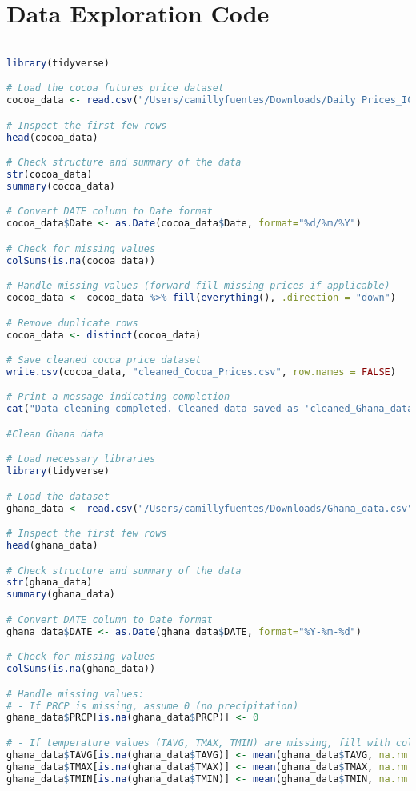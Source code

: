 \chapter{Data Exploration Code}
\label{appn:B}
\begin{lstlisting}[language=R]

library(tidyverse)

# Load the cocoa futures price dataset
cocoa_data <- read.csv("/Users/camillyfuentes/Downloads/Daily Prices_ICCO.csv", stringsAsFactors = FALSE)

# Inspect the first few rows
head(cocoa_data)

# Check structure and summary of the data
str(cocoa_data)
summary(cocoa_data)

# Convert DATE column to Date format
cocoa_data$Date <- as.Date(cocoa_data$Date, format="%d/%m/%Y")

# Check for missing values
colSums(is.na(cocoa_data))

# Handle missing values (forward-fill missing prices if applicable)
cocoa_data <- cocoa_data %>% fill(everything(), .direction = "down")

# Remove duplicate rows
cocoa_data <- distinct(cocoa_data)

# Save cleaned cocoa price dataset
write.csv(cocoa_data, "cleaned_Cocoa_Prices.csv", row.names = FALSE)

# Print a message indicating completion
cat("Data cleaning completed. Cleaned data saved as 'cleaned_Ghana_data.csv' and 'cleaned_Cocoa_Prices.csv'\n")

#Clean Ghana data

# Load necessary libraries
library(tidyverse)

# Load the dataset
ghana_data <- read.csv("/Users/camillyfuentes/Downloads/Ghana_data.csv", stringsAsFactors = FALSE)

# Inspect the first few rows
head(ghana_data)

# Check structure and summary of the data
str(ghana_data)
summary(ghana_data)

# Convert DATE column to Date format
ghana_data$DATE <- as.Date(ghana_data$DATE, format="%Y-%m-%d")

# Check for missing values
colSums(is.na(ghana_data))

# Handle missing values:
# - If PRCP is missing, assume 0 (no precipitation)
ghana_data$PRCP[is.na(ghana_data$PRCP)] <- 0

# - If temperature values (TAVG, TMAX, TMIN) are missing, fill with column mean
ghana_data$TAVG[is.na(ghana_data$TAVG)] <- mean(ghana_data$TAVG, na.rm = TRUE)
ghana_data$TMAX[is.na(ghana_data$TMAX)] <- mean(ghana_data$TMAX, na.rm = TRUE)
ghana_data$TMIN[is.na(ghana_data$TMIN)] <- mean(ghana_data$TMIN, na.rm = TRUE)


\end{lstlisting}

